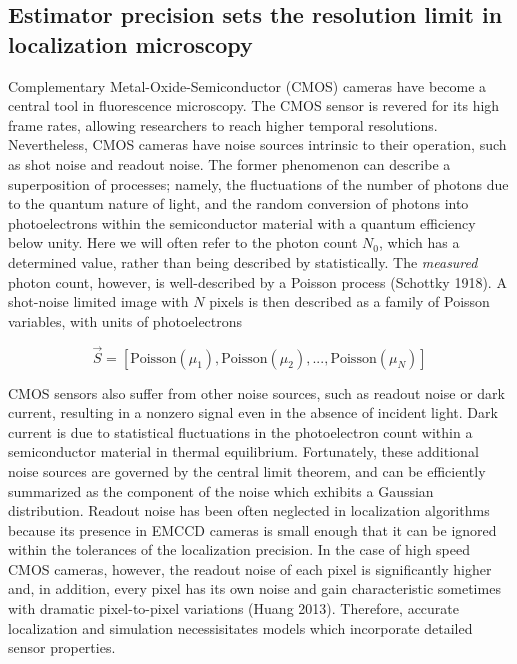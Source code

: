 \documentclass{ucetd}
\begin{document}

\subsection{Estimator precision sets the resolution limit in localization microscopy}

Complementary Metal-Oxide-Semiconductor (CMOS) cameras have become a central tool in fluorescence microscopy. The CMOS sensor is revered for its high frame rates, allowing researchers to reach higher temporal resolutions. Nevertheless, CMOS cameras have noise sources intrinsic to their operation, such as shot noise and readout noise. The former phenomenon can describe a superposition of processes; namely, the fluctuations of the number of photons due to the quantum nature of light, and the random conversion of photons into photoelectrons within the semiconductor material with a quantum efficiency below unity. Here we will often refer to the photon count $N_{0}$, which has a determined value, rather than being described by statistically. The \emph{measured} photon count, however, is well-described by a Poisson process (Schottky 1918). A shot-noise limited image with $N$ pixels is then described as a family of Poisson variables, with units of photoelectrons


\begin{equation}
\vec{S} = \left[\mathrm{Poisson}(\mu_{1}), \mathrm{Poisson}(\mu_{2}), ..., \mathrm{Poisson}(\mu_{N})\right]
\end{equation}

CMOS sensors also suffer from other noise sources, such as readout noise or dark current, resulting in a nonzero signal even in the absence of incident light. Dark current is due to statistical fluctuations in the photoelectron count within a semiconductor material in thermal equilibrium. Fortunately, these additional noise sources are governed by the central limit theorem, and can be efficiently summarized as the component of the noise which exhibits a Gaussian distribution. Readout noise has been often neglected in localization algorithms because its presence in EMCCD cameras is small enough that it can be ignored within the tolerances of the localization precision. In the case of high speed CMOS cameras, however, the readout noise of each pixel is significantly higher and, in addition, every pixel has its own noise and gain characteristic sometimes with dramatic pixel-to-pixel variations (Huang 2013). Therefore, accurate localization and simulation necessisitates models which incorporate detailed sensor properties. 
\end{document}
